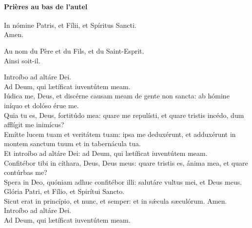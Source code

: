 \documentclass[twoside]{article}
\begin{document}
\paragraph{Prières au bas de l'autel}

\begin{paracol}{2}

\vv In nómine Patris, \cc et Fílii, et Spíritus Sancti. \\
\rr Amen.

\switchcolumn

\rr Au nom du Père et du Fils, et du Saint-Esprit. \\
\rr Ainsi soit-il.

\switchcolumn*

\vv Introíbo ad altáre Dei.\\
\rr Ad Deum, qui lætíficat iuventútem meam.\\
\vv Iúdica me, Deus, et discérne causam meam de gente non sancta: ab hómine iníquo et dolóso érue me.\\
\rr Quia tu es, Deus, fortitúdo mea: quare me repulísti, et quare tristis incédo, dum afflígit me inimícus?\\
\vv Emítte lucem tuam et veritátem tuam: ipsa me deduxérunt, et adduxérunt in montem sanctum tuum et in tabernácula tua.\\
\rr Et introíbo ad altáre Dei: ad Deum, qui lætíficat iuventútem meam.\\
\vv Confitébor tibi in cíthara, Deus, Deus meus: quare tristis es, ánima mea, et quare contúrbas me?\\
\rr Spera in Deo, quóniam adhuc confitébor illi: salutáre vultus mei, et Deus meus.\\
\vv Glória Patri, et Fílio, et Spirítui Sancto.\\
\rr Sicut erat in princípio, et nunc, et semper: et in sǽcula sæculórum. Amen.\\
\vv Introíbo ad altáre Dei.\\
\rr Ad Deum, qui lætíficat iuventútem meam.

\switchcolumn


\end{paracol}
\end{document}
